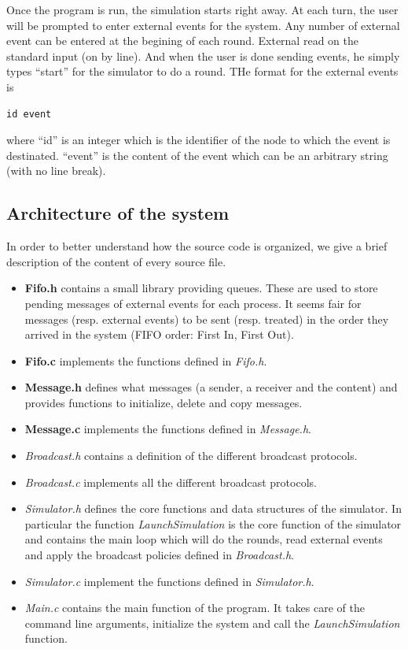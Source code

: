 \documentclass[a4paper]{article}
\begin{document}
Once the program is run, the simulation starts right away. At each turn, the
user will be prompted to enter external events for the system. Any number of
external event can be entered at the begining of each round. External read on
the standard input (on by line). And when the user is done sending events, he
simply types ``start'' for the simulator to do a round. THe format for the
external events is
\begin{lstlisting}
id event
\end{lstlisting}
where ``id'' is an integer which is the identifier of the node to which the
event is destinated. ``event'' is the content of the event which can be an
arbitrary string (with no line break).

\subsection{Architecture of the system}
In order to better understand how the source code is organized, we give a
brief description of the content of every source file.
\begin{itemize}
  \item \textbf{Fifo.h} contains a small library providing queues. These are
        used to store pending messages of external events for each process.
        It seems fair for messages (resp. external events) to be sent (resp.
        treated) in the order they arrived in the system (FIFO order: First
        In, First Out).
  \item \textbf{Fifo.c} implements the functions defined in \textit{Fifo.h}.
  \item \textbf{Message.h} defines what messages (a sender, a receiver and the
        content) and provides functions to initialize, delete and copy
        messages.
  \item \textbf{Message.c} implements the functions defined in
        \textit{Message.h}.
  \item \textit{Broadcast.h} contains a definition of the different broadcast
        protocols.
  \item \textit{Broadcast.c} implements all the different broadcast protocols.
  \item \textit{Simulator.h} defines the core functions and data structures
        of the simulator. In particular the function \textit{LaunchSimulation}
        is the core function of the simulator and contains the main loop which
        will do the rounds, read external events and apply the broadcast
        policies defined in \textit{Broadcast.h}.
  \item \textit{Simulator.c} implement the functions defined in
        \textit{Simulator.h}.
  \item \textit{Main.c} contains the main function of the program. It takes
        care of the command line arguments, initialize the system and call
        the \textit{LaunchSimulation} function.
\end{itemize}
\end{document}
